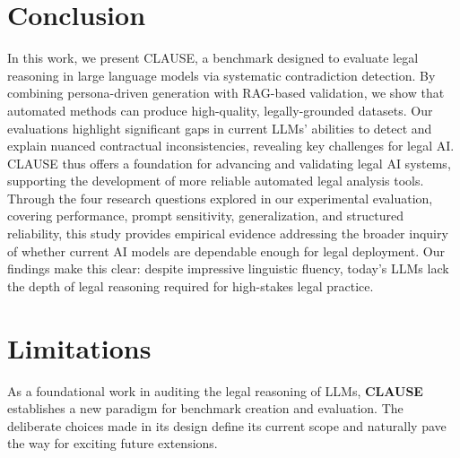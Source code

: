 \documentclass[11pt]{article}
\newcommand{\datasetName}{{\sc CLAUSE}\xspace}
\begin{document}
\section{Conclusion}
\vspace{-0.5em}
In this work, we present \datasetName, a benchmark designed to evaluate legal reasoning in large language models via systematic contradiction detection. By combining persona-driven generation with RAG-based validation, we show that automated methods can produce high-quality, legally-grounded datasets. Our evaluations highlight significant gaps in current LLMs’ abilities to detect and explain nuanced contractual inconsistencies, revealing key challenges for legal AI. \datasetName thus offers a foundation for advancing and validating legal AI systems, supporting the development of more reliable automated legal analysis tools. Through the four research questions explored in our experimental evaluation, covering performance, prompt sensitivity, generalization, and structured reliability, this study provides empirical evidence addressing the broader inquiry of whether current AI models are dependable enough for legal deployment. Our findings make this clear: despite impressive linguistic fluency, today’s LLMs lack the depth of legal reasoning required for high-stakes legal practice.

\section*{Limitations}
As a foundational work in auditing the legal reasoning of LLMs, \textbf{CLAUSE} establishes a new paradigm for benchmark creation and evaluation. The deliberate choices made in its design define its current scope and naturally pave the way for exciting future extensions.
\end{document}
